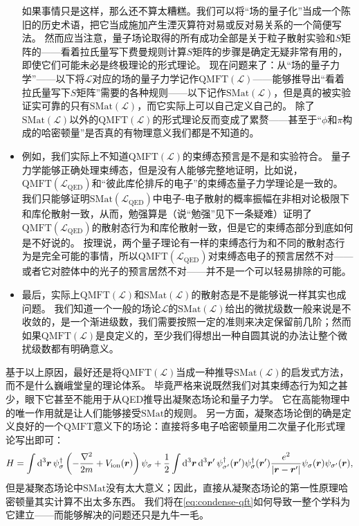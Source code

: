 \documentclass[hyperref, UTF8, a4paper]{ctexbook}
\newcommand{\soliddoc}{\href{../solid/solid}{固体物理笔记}}
\begin{document}
\begin{itemize}
    如果事情只是这样，那么还不算太糟糕。我们可以将“场的量子化”当成一个陈旧的历史术语，把它当成施加产生湮灭算符对易或反对易关系的一个简便写法。
    然而应当注意，量子场论取得的所有成功全部是关于粒子散射实验和$S$矩阵的——看着拉氏量写下费曼规则计算$S$矩阵的步骤是确定无疑非常有用的，即使它们可能未必是终极理论的形式理论。
    现在问题来了：从“场的量子力学”——以下将$\mathcal{L}$对应的场的量子力学记作$\mathrm{QMFT}(\mathcal{L})$——能够推导出“看着拉氏量写下$S$矩阵”需要的各种规则——以下记作$\mathrm{SMat}(\mathcal{L})$，但是真的被实验证实可靠的只有$\mathrm{SMat}(\mathcal{L})$，而它实际上可以自己定义自己的。
    除了$\mathrm{SMat}(\mathcal{L})$以外的$\mathrm{QMFT}(\mathcal{L})$的形式理论反而变成了累赘——甚至于“$\phi$和$\pi$构成的哈密顿量”是否真的有物理意义我们都是不知道的。
    \item 例如，我们实际上不知道$\mathrm{QMFT}(\mathcal{L})$的束缚态预言是不是和实验符合。
    量子力学能够正确处理束缚态，但是没有人能够完整地证明，比如说，$\mathrm{QMFT}(\mathcal{L}_\text{QED})$和“彼此库伦排斥的电子”的束缚态量子力学理论是一致的。
    我们只能够证明$\mathrm{SMat}(\mathcal{L}_\text{QED})$中电子-电子散射的概率振幅在非相对论极限下和库伦散射一致，从而，勉强算是（说“勉强”见下一条疑难）证明了$\mathrm{QMFT}(\mathcal{L}_\text{QED})$的散射态行为和库伦散射一致，但是它的束缚态部分到底如何是不好说的。
    按理说，两个量子理论有一样的束缚态行为和不同的散射态行为是完全可能的事情，所以$\mathrm{QMFT}(\mathcal{L}_\text{QED})$对束缚态电子的预言居然不对——或者它对腔体中的光子的预言居然不对——并不是一个可以轻易排除的可能。
    \item 最后，实际上$\mathrm{QMFT}(\mathcal{L})$和$\mathrm{SMat}(\mathcal{L})$的散射态是不是能够说一样其实也成问题。
    我们知道一个一般的场论$\mathcal{L}$的$\mathrm{SMat}(\mathcal{L})$给出的微扰级数一般来说是不收敛的，是一个渐进级数，我们需要按照一定的准则来决定保留前几阶；然而如果$\mathrm{QMFT}(\mathcal{L})$是良定义的，至少我们得想出一种自圆其说的办法让整个微扰级数都有明确意义。
\end{itemize}

基于以上原因，最好还是将$\mathrm{QMFT}(\mathcal{L})$当成一种推导$\mathrm{SMat}(\mathcal{L})$的启发式方法，而不是什么巍峨堂皇的理论体系。
毕竟严格来说既然我们对其束缚态行为知之甚少，眼下它甚至不能用于从QED推导出凝聚态场论和量子力学。
它在高能物理中的唯一作用就是让人们能够接受$\mathrm{SMat}$的规则。
另一方面，凝聚态场论倒的确是定义良好的一个$\mathrm{QMFT}$意义下的场论：直接将多电子哈密顿量用二次量子化形式理论写出即可：
\begin{equation}
    H = \int \dd[3]{\vb*{r}} \psi^\dagger_\sigma \left( - \frac{\laplacian}{2m} + V_\text{ion}(\vb*{r}) \right) \psi_\sigma + \frac{1}{2} \int \dd[3]{\vb*{r}} \dd[3]{\vb*{r}'} \psi^\dagger_{\sigma'}(\vb*{r}') \psi^\dagger_\sigma(\vb*{r}') \frac{e^2}{\abs{\vb*{r} - \vb*{r}'}} \psi_\sigma(\vb*{r}) \psi_{\sigma'}(\vb*{r}),
    \label{eq:condense-qft}
\end{equation}
但是凝聚态场论中$\mathrm{SMat}$没有太大意义；因此，直接从凝聚态场论的第一性原理哈密顿量其实计算不出太多东西。
我们将在\eqref{eq:condense-qft}如何导致一整个学科为它建立——而能够解决的问题还只是九牛一毛。
\end{document}
